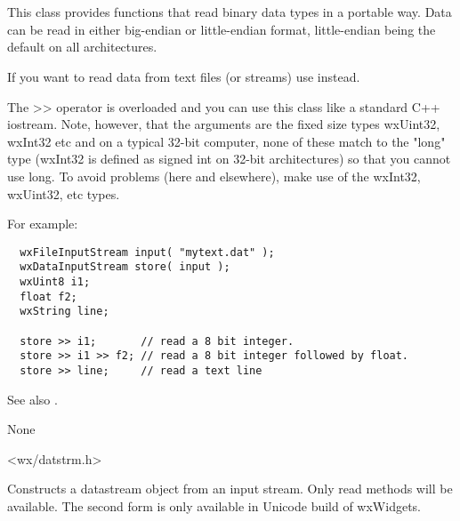 \section{}\label{wxdatainputstream}

This class provides functions that read binary data types in a
portable way. Data can be read in either big-endian or little-endian
format, little-endian being the default on all architectures.

If you want to read data from text files (or streams) use 
 instead.

The >> operator is overloaded and you can use this class like a standard C++ iostream.
Note, however, that the arguments are the fixed size types wxUint32, wxInt32 etc
and on a typical 32-bit computer, none of these match to the "long" type (wxInt32
is defined as signed int on 32-bit architectures) so that you cannot use long. To avoid
problems (here and elsewhere), make use of the wxInt32, wxUint32, etc types.

For example:

\begin{verbatim}
  wxFileInputStream input( "mytext.dat" );
  wxDataInputStream store( input );
  wxUint8 i1;
  float f2;
  wxString line;

  store >> i1;       // read a 8 bit integer.
  store >> i1 >> f2; // read a 8 bit integer followed by float.
  store >> line;     // read a text line
\end{verbatim}

See also . 


None


<wx/datstrm.h>


\label{wxdatainputstreamctor}



Constructs a datastream object from an input stream. Only read methods will
be available. The second form is only available in Unicode build of wxWidgets.

